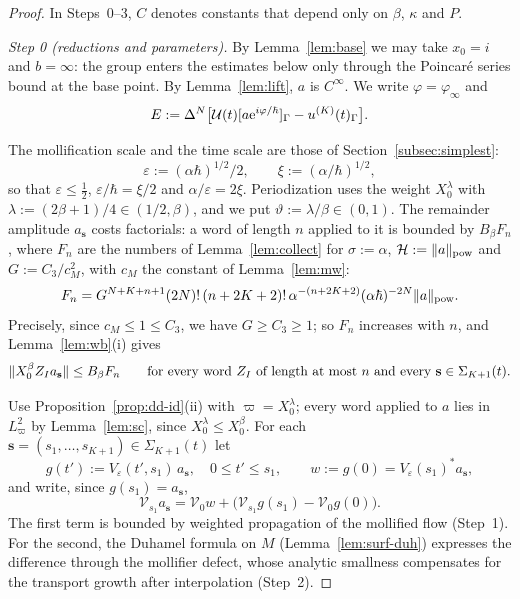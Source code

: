 \begin{proof}
In Steps~0--3, $C$ denotes constants that depend only on $\beta$, $\kappa$ and $P$.

\medskip\noindent\emph{Step 0 (reductions and parameters).} By Lemma~\ref{lem:base} we may take $x_0=i$ and $b=\infty$: the group enters the estimates below only
through the Poincar\'e series bound at the base point. By Lemma~\ref{lem:lift}, $a$ is $C^\infty$. We write $\varphi=\varphi_\infty$ and
\[
 E:=\Delta^N\bigl[\mathcal{U}(t)[a\mathrm{e}^{i\varphi/\hbar}]_\Gamma-u^{(K)}(t)_\Gamma\bigr].
\]

The mollification scale and the time scale are those of Section~\ref{subsec:simplest}:
\[
\varepsilon:=(\alpha\hbar)^{1/2}/2,\qquad \xi:=(\alpha/\hbar)^{1/2},
\]
so that $\varepsilon\le\tfrac12$, $\varepsilon/\hbar=\xi/2$ and $\alpha/\varepsilon=2\xi$. Periodization uses the weight $X_0^\lambda$ with
$\lambda:=(2\beta+1)/4\in(1/2,\beta)$, and we put $\vartheta:=\lambda/\beta\in(0,1)$.
The remainder amplitude $a_{\mathbf s}$ costs factorials: a word of length $n$ applied to it is bounded by $B_\beta F_n$, where $F_n$
are the numbers of Lemma~\ref{lem:collect} for $\sigma:=\alpha$, $\mathcal H:=\lVert a\rVert_{\mathrm{pow}}$ and $G:=C_3/c_M^2$, with $c_M$ the constant of
Lemma~\ref{lem:mw}:
\[
F_n=G^{N+K+n+1}(2N)!\,(n+2K+2)!\,\alpha^{-(n+2K+2)}(\alpha\hbar)^{-2N}\lVert a\rVert_{\mathrm{pow}} .
\]
Precisely, since $c_M\le1\le C_3$, we have $G\ge C_3\ge1$; so $F_n$ increases with $n$, and Lemma~\ref{lem:wb}(i) gives
\begin{equation}\label{dd:words}
\lVert X_0^\beta Z_Ia_{\mathbf s}\rVert\le B_\beta F_n\qquad\text{for every word $Z_I$ of length at most $n$ and every $\mathbf s\in\Sigma_{K+1}(t)$.}
\end{equation}

Use Proposition~\ref{prop:dd-id}(ii) with $\varpi=X_0^\lambda$; every word applied to $a$ lies in $L^2_\varpi$ by Lemma~\ref{lem:sc}, since $X_0^\lambda\le X_0^\beta$. For each $\mathbf s=(s_1,\dots,s_{K+1})\in\Sigma_{K+1}(t)$ let
\[
g(t'):=V_\varepsilon(t',s_1)\,a_{\mathbf s},\quad0\le t'\le s_1,\qquad w:=g(0)=V_\varepsilon(s_1)^*a_{\mathbf s},
\]
and write, since $g(s_1)=a_{\mathbf s}$,
\[
 \mathcal V_{s_1}a_{\mathbf s}=\mathcal V_0w+\bigl(\mathcal V_{s_1}g(s_1)-\mathcal V_0g(0)\bigr).
\]
The first term is bounded by weighted propagation of the mollified flow (Step~1). For the second, the Duhamel formula on $M$ (Lemma~\ref{lem:surf-duh})
expresses the difference through the mollifier defect, whose analytic smallness compensates for the transport growth
after interpolation (Step~2).


\end{proof}
